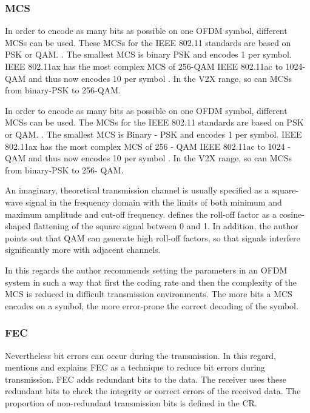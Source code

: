\subsubsection*{\acf{MCS}}

In order to encode as many bits as possible on one \ac{OFDM} symbol, different \ac{MCS}s can be used.
These \ac{MCS}s for the IEEE 802.11 standards are based on \ac{PSK} or \ac{QAM}. \cite{kauffels_wireless_2002}. 
The smallest \ac{MCS} is binary \ac{PSK} and encodes \SI{1}{\bit} per symbol. IEEE 802.11ax has the most complex \ac{MCS} of \num{256}-\ac{QAM} IEEE 802.11ac to \num{1024}-\ac{QAM} and thus now encodes \SI{10}{\bit} per symbol \cite{afaqui_ieee_2017}.
In the \ac{V2X} range, so can \ac{MCS}s from binary-\ac{PSK} to \num{256}-\ac{QAM}.

In order to encode as many bits as possible on one \ac{OFDM} symbol, different \ac{MCS}s can be used.
The \ac{MCS}s for the IEEE 802.11 standards are based on \ac{PSK} or \ac{QAM}. \cite{kauffels_wireless_2002}. 
The smallest \ac{MCS} is Binary - \ac{PSK} and encodes \SI{1}{\bit} per symbol. IEEE 802.11ax has the most complex \ac{MCS} of \num{256} - \ac{QAM} IEEE 802.11ac to \num{1024} - \ac{QAM} and thus now encodes \SI{10}{\bit} per symbol \cite{afaqui_ieee_2017}.
In the \ac{V2X} range, so can \ac{MCS}s from binary-\ac{PSK} to \num{256}- \ac{QAM}.

An imaginary, theoretical transmission channel is usually specified as a square-wave signal in the frequency domain with the limits of both minimum and maximum amplitude and cut-off frequency. \textcite{kauffels_wireless_2002} defines the roll-off factor as a cosine-shaped flattening of the square signal between 0 and 1. In addition, the author points out that \ac{QAM} can generate high roll-off factors, so that signals interfere significantly more with adjacent channels.

In this regards the author recommends setting the parameters in an \ac{OFDM} system in such a way that first the coding rate and then the complexity of the \ac{MCS} is reduced in difficult transmission environments. The more bits a \ac{MCS} encodes on a symbol, the more error-prone the correct decoding of the symbol.

\subsubsection*{\acf{FEC}}

Nevertheless bit errors can occur during the transmission. In this regard, \cite{kauffels_wireless_2002}
mentions and explains \ac{FEC} as a technique to reduce bit errors during transmission. \ac{FEC} adds redundant bits
to the data. The receiver uses these redundant bits to check the integrity or correct errors of the received data.
The proportion of non-redundant transmission bits is defined in the \ac{CR}.

